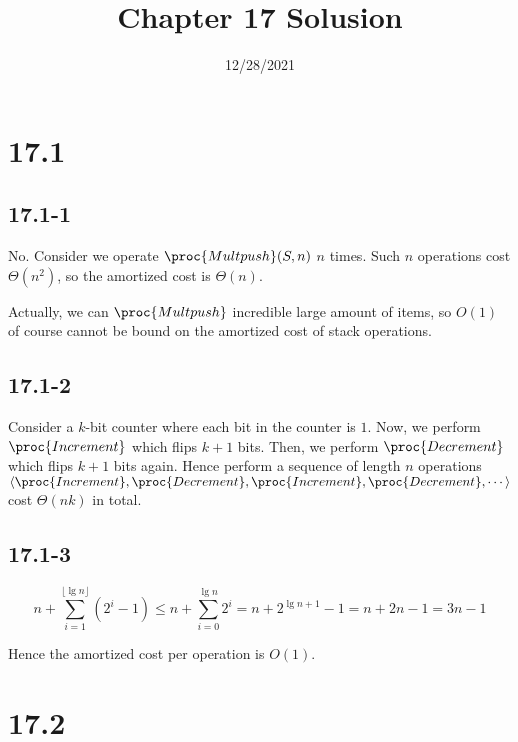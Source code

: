 

\title{Chapter 17 Solusion}
\date{12/28/2021}


\maketitle

\section*{17.1}

\subsection*{17.1-1}

No.
Consider we operate $\proc{Multpush}(S,n)$ $n$ times.
Such $n$ operations cost $\Theta(n^2)$, 
so the amortized cost is $\Theta(n)$.

Actually, we can $\proc{Multpush}$ incredible large amount of items,
so $O(1)$ of course cannot be bound on the amortized cost
of stack operations.

\subsection*{17.1-2}

Consider a $k$-bit counter where each bit in the counter is $1$.
Now, we perform $\proc{Increment}$ which flips $k+1$ bits.
Then, we perform $\proc{Decrement}$ which flips $k+1$ bits again.
Hence perform a sequence of length $n$ operations 
$\langle \proc{Increment}, \proc{Decrement}, 
\proc{Increment}, \proc{Decrement}, \cdots \rangle$
cost $\Theta(nk)$ in total.

\subsection*{17.1-3}

\begin{equation*}
    n + \sum\limits_{i = 1}^{\lfloor \lg n \rfloor} (2^i - 1)
    \leq n + \sum\limits_{i = 0}^{\lg n} 2^i
    = n + 2^{\lg n + 1} - 1 = n + 2n - 1 = 3n - 1
\end{equation*}

Hence the amortized cost per operation is $O(1)$.

\section*{17.2}

